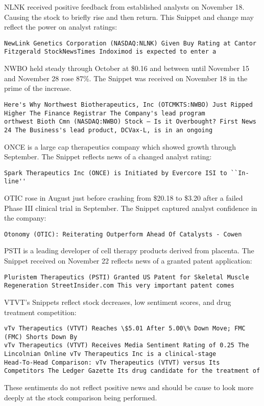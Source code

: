 \documentclass[sigconf]{acmart}
\begin{document}
NLNK received positive feedback from established analysts on November 18. Causing the stock to briefly rise and then return. This Snippet and change may reflect the power on analyst ratings:
\begin{lstlisting}
NewLink Genetics Corporation (NASDAQ:NLNK) Given Buy Rating at Cantor Fitzgerald StockNewsTimes Indoximod is expected to enter a
\end{lstlisting}

NWBO held steady through October at \$0.16 and between until November 15 and November 28 rose 87\%. The Snippet was received on November 18 in the prime of the increase.
\begin{lstlisting}
Here's Why Northwest Biotherapeutics, Inc (OTCMKTS:NWBO) Just Ripped Higher The Finance Registrar The Company's lead program
orthwest Bioth Cmn (NASDAQ:NWBO) Stock – Is it Overbought? First News 24 The Business's lead product, DCVax-L, is in an ongoing
\end{lstlisting}

ONCE is a large cap therapeutics company which showed growth through September. The Snippet reflects news of a changed analyst rating:
\begin{lstlisting}
Spark Therapeutics Inc (ONCE) is Initiated by Evercore ISI to ``In-line''
\end{lstlisting}

OTIC rose in August just before crashing from \$20.18 to \$3.20 after a failed Phase III clinical trial in September. The Snippet captured analyst confidence in the company: 
\begin{lstlisting}
Otonomy (OTIC): Reiterating Outperform Ahead Of Catalysts - Cowen
\end{lstlisting}

PSTI is a leading developer of cell therapy products derived from placenta. The Snippet received on November 22 reflects news of a granted patent application:
\begin{lstlisting}
Pluristem Therapeutics (PSTI) Granted US Patent for Skeletal Muscle Regeneration StreetInsider.com This very important patent comes
\end{lstlisting}

VTVT's Snippets reflect stock decreases, low sentiment scores, and drug treatment competition:
\begin{lstlisting}
vTv Therapeutics (VTVT) Reaches \$5.01 After 5.00\% Down Move; FMC (FMC) Shorts Down By
vTv Therapeutics (VTVT) Receives Media Sentiment Rating of 0.25 The Lincolnian Online vTv Therapeutics Inc is a clinical-stage
Head-To-Head Comparison: vTv Therapeutics (VTVT) versus Its Competitors The Ledger Gazette Its drug candidate for the treatment of
\end{lstlisting}
These sentiments do not reflect positive news and should be cause to look more deeply at the stock comparison being performed. 
\end{document}
